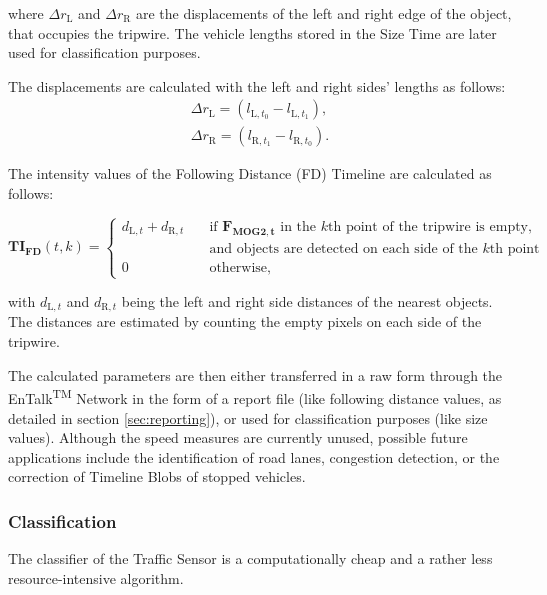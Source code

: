 where $\Delta r_{\text{L}}$ and $\Delta r_{\text{R}}$ are the displacements of the left and right edge of the object, that occupies the tripwire.
The vehicle lengths stored in the Size Time are later used for classification purposes.

The displacements are calculated with the left and right sides' lengths as follows:
\begin{gather*}
\Delta r_{\text{L}} = \left( l_{\text{L},t_0} - l_{\text{L},t_1} \right),  \\
\Delta r_{\text{R}} = \left( l_{\text{R},t_1} - l_{\text{R},t_0}\right).
\end{gather*}

The intensity values of the Following Distance (FD) Timeline are calculated as follows:

\begin{displaymath}
\boldsymbol{TI_{\text{FD}}}(t,k) = 
\begin{cases}
d_{\text{L},t} + d_{\text{R},t} 		& \quad \text{if } \boldsymbol{F_{\text{MOG2},t}} \text{ in the } k\text{th} \text{ point of the tripwire is empty,} \\ & \quad \text{and objects are detected on each side of the } k \text{th point}\\
0		& \quad \text{otherwise},
\end{cases}
\end{displaymath}

with $d_{\text{L},t}$ and $d_{\text{R},t}$ being the left and right side distances of the nearest objects.
The distances are estimated by counting the empty pixels on each side of the tripwire.

The calculated parameters are then either transferred in a raw form through the EnTalk\textsuperscript{TM} Network in the form of a report file (like following distance values, as detailed in section \ref{sec:reporting}), or used for classification purposes (like size values).
Although the speed measures are currently unused, possible future applications include the identification of road lanes, congestion detection, or the correction of Timeline Blobs of stopped vehicles.

\subsubsection{Classification}\label{sec:classification}
The classifier of the Traffic Sensor is a computationally cheap and a rather less resource-intensive algorithm.

